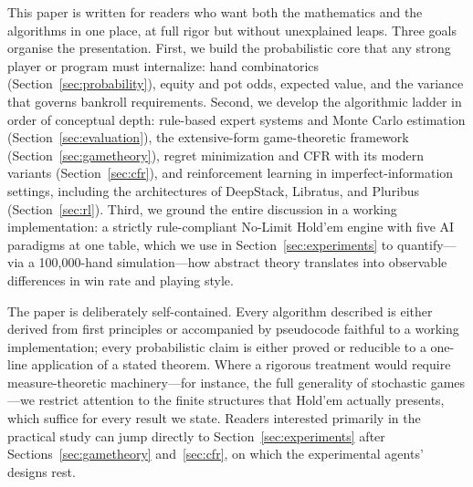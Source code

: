 This paper is written for readers who want both the mathematics and the algorithms in one place, at full rigor but without unexplained leaps. Three goals organise the presentation. First, we build the probabilistic core that any strong player or program must internalize: hand combinatorics (Section~\ref{sec:probability}), equity and pot odds, expected value, and the variance that governs bankroll requirements. Second, we develop the algorithmic ladder in order of conceptual depth: rule-based expert systems and Monte Carlo estimation (Section~\ref{sec:evaluation}), the extensive-form game-theoretic framework (Section~\ref{sec:gametheory}), regret minimization and CFR with its modern variants (Section~\ref{sec:cfr}), and reinforcement learning in imperfect-information settings, including the architectures of DeepStack, Libratus, and Pluribus (Section~\ref{sec:rl}). Third, we ground the entire discussion in a working implementation: a strictly rule-compliant No-Limit Hold'em engine with five AI paradigms at one table, which we use in Section~\ref{sec:experiments} to quantify---via a 100{,}000-hand simulation---how abstract theory translates into observable differences in win rate and playing style.

The paper is deliberately self-contained. Every algorithm described is either derived from first principles or accompanied by pseudocode faithful to a working implementation; every probabilistic claim is either proved or reducible to a one-line application of a stated theorem. Where a rigorous treatment would require measure-theoretic machinery---for instance, the full generality of stochastic games---we restrict attention to the finite structures that Hold'em actually presents, which suffice for every result we state. Readers interested primarily in the practical study can jump directly to Section~\ref{sec:experiments} after Sections~\ref{sec:gametheory} and~\ref{sec:cfr}, on which the experimental agents' designs rest.
